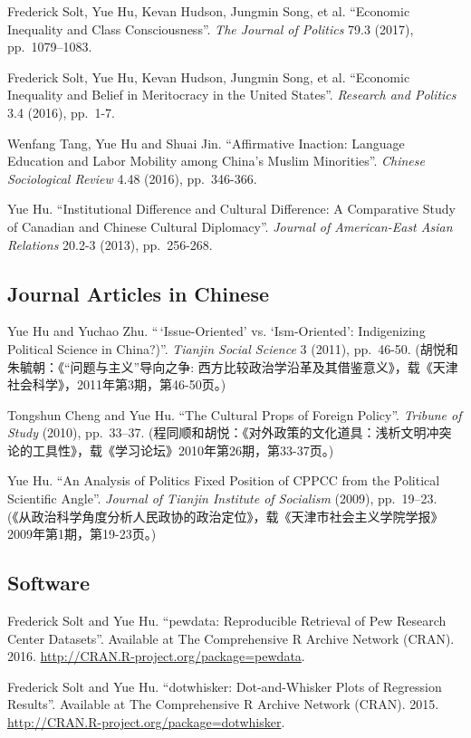 \documentclass[10.5pt,]{article}
\begin{document}
Frederick Solt, Yue Hu, Kevan Hudson, Jungmin Song, et al. ``Economic
Inequality and Class Consciousness''. \emph{The Journal of Politics}
79.3 (2017), pp.~1079--1083.

Frederick Solt, Yue Hu, Kevan Hudson, Jungmin Song, et al. ``Economic
Inequality and Belief in Meritocracy in the United States''.
\emph{Research and Politics} 3.4 (2016), pp.~1-7.

Wenfang Tang, Yue Hu and Shuai Jin. ``Affirmative Inaction: Language
Education and Labor Mobility among China's Muslim Minorities''.
\emph{Chinese Sociological Review} 4.48 (2016), pp.~346-366.

Yue Hu. ``Institutional Difference and Cultural Difference: A
Comparative Study of Canadian and Chinese Cultural Diplomacy''.
\emph{Journal of American-East Asian Relations} 20.2-3 (2013),
pp.~256-268.

\subsection{Journal Articles in
Chinese}\label{journal-articles-in-chinese}

Yue Hu and Yuchao Zhu. ``\,`Issue-Oriented' vs. `Ism-Oriented':
Indigenizing Political Science in China?)''. \emph{Tianjin Social
Science} 3 (2011), pp.~46-50. (胡悦和朱毓朝：《``问题与主义''导向之争:
西方比较政治学沿革及其借鉴意义》，载《天津社会科学》，2011年第3期，第46-50页。)

Tongshun Cheng and Yue Hu. ``The Cultural Props of Foreign Policy''.
\emph{Tribune of Study} (2010), pp.~33--37.
(程同顺和胡悦：《对外政策的文化道具：浅析文明冲突论的工具性》，载《学习论坛》2010年第26期，第33-37页。)

Yue Hu. ``An Analysis of Politics Fixed Position of CPPCC from the
Political Scientific Angle''. \emph{Journal of Tianjin Institute of
Socialism} (2009), pp.~19--23.
(《从政治科学角度分析人民政协的政治定位》，载《天津市社会主义学院学报》
2009年第1期，第19-23页。)

\subsection{Software}\label{software}

Frederick Solt and Yue Hu. ``pewdata: Reproducible Retrieval of Pew
Research Center Datasets''. Available at The Comprehensive R Archive
Network (CRAN). 2016. \url{http://CRAN.R-project.org/package=pewdata}.

Frederick Solt and Yue Hu. ``dotwhisker: Dot-and-Whisker Plots of
Regression Results''. Available at The Comprehensive R Archive Network
(CRAN). 2015. \url{http://CRAN.R-project.org/package=dotwhisker}.
\end{document}
